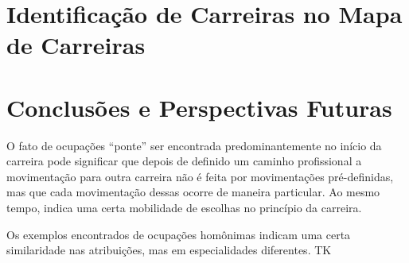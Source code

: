 \documentclass[
  article,
  11pt,
  a4paper,
  english,
  brazil,
  sumario=tradicional]{abntex2}
\begin{document}
\section{Identificação de Carreiras no Mapa de Carreiras}

\section{Conclusões e Perspectivas Futuras}

O fato de ocupações \enquote{ponte} ser encontrada predominantemente no início da carreira pode significar que depois de definido um caminho profissional a movimentação para outra carreira não é feita por movimentações pré-definidas, mas que cada movimentação dessas ocorre de maneira particular. Ao mesmo tempo, indica uma certa mobilidade de escolhas no princípio da carreira.

Os exemplos encontrados de ocupações homônimas indicam uma certa similaridade nas atribuições, mas em especialidades diferentes. TK

\newpage


\end{document}
